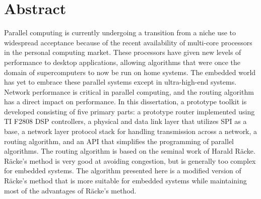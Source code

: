 \tableofcontents

\chapter{Abstract}
Parallel computing is currently undergoing a transition from a niche use to widespread acceptance because of the recent availability of multi-core processors in the personal computing market. These processors have given new levels of performance to desktop applications, allowing algorithms that were once the domain of supercomputers to now be run on home systems. The embedded world has yet to embrace these parallel systems except in ultra-high-end systems. Network performance is critical in parallel computing, and the routing algorithm has a direct impact on performance. In this dissertation, a prototype toolkit is developed consisting of five primary parts: a prototype router implemented using TI F2808 DSP controllers, a physical and data link layer that utilizes SPI as a base, a network layer protocol stack for handling transmission across a network, a routing algorithm, and an API that simplifies the programming of parallel algorithms. The routing algorithm is based on the seminal work of Harald R\"acke. R\"acke's method is very good at avoiding congestion, but is generally too complex for embedded systems. The algorithm presented here is a modified version of R\"acke's method that is more suitable for embedded systems while maintaining most of the advantages of R\"acke's method.

\listoftables
{}

\listoffigures
{}
